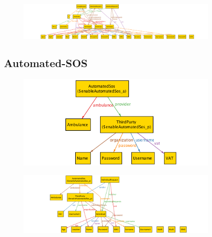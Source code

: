 \documentclass[a4paper]{article}
\begin{document}
    
    
    \begin{figure}[!htpb]
    	\centering
    	\includegraphics[width=100mm]{images/alloy/Data4HelpComplete.png}
    \end{figure}

\subsection{Automated-SOS}
    
    
    
    
    \begin{figure}[!htpb]
    	\centering
    	\includegraphics[width=100mm]{images/alloy/enableAutomatedSos.png}
    \end{figure}
    
    
    
    \begin{figure}[!h]
    	\centering
    	\includegraphics[width=100mm]{images/alloy/runAutomatedSos.png}
    \end{figure}
    \newpage
    
    
\end{document}
